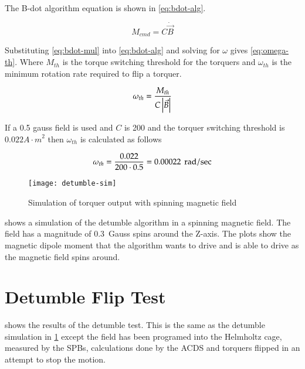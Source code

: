 The B-dot algorithm equation is shown in \cref{eq:bdot-alg}.

\begin{equation}
    M_{cmd} = C \dot{\vec{B}} 
    \label{eq:bdot-alg}
\end{equation}

Substituting \cref{eq:bdot-mul} into \cref{eq:bdot-alg} and solving for $\omega$ gives \cref{eq:omega-th}. Where $M_{th}$ is the torque switching threshold for the torquers and $\omega_{th}$ is the minimum rotation rate required to flip a torquer.

\begin{equation}
    \omega _ {th} = {M _ {th} \over{ {C \left| \vec{B} \right|}}}
    \label{eq:omega-th}
\end{equation}

If a 0.5 gauss field is used and $C$ is 200 and the torquer switching threshold is $0.022 \unit{A \cdot m} ^2$ then $\omega_{th}$ is calculated as follows

\begin{equation}
    \omega _ {th} = { 0.022 \over{ {200 \cdot 0.5}}} = 0.00022 ~ \, \mathrm{rad / sec}
\end{equation}

\begin{figure}[!ht]
    \centering
    \texttt{[image: detumble-sim]}
  \caption{Simulation of torquer output with spinning magnetic field}
    \label{fig:detumble-sim}
\end{figure}


 shows a simulation of the detumble algorithm in a spinning magnetic field. The field has a magnitude of 0.3~Gauss spins around the Z-axis. The plots show the magnetic dipole moment that the algorithm wants to drive and is able to drive as the magnetic field spins around.


\section{Detumble Flip Test}

 shows the results of the detumble test. This is the same as the detumble simulation in \cref{fig:detumble-sim} except the field has been programed into the Helmholtz cage, measured by the \acp{SPB}, calculations done by the \ac{ACDS} and torquers flipped in an attempt to stop the motion.

